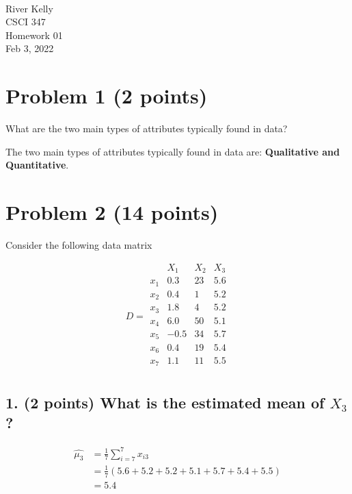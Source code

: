 \documentclass[11pt]{article}
\newcommand{\course}{CSCI 347}
\newcommand{\proj}{Homework 01}
\begin{document}
{ ~\\
    River Kelly \\
    \course \\
    \proj \\
    Feb 3, 2022 \\
}

\section*{Problem 1 (2 points)}

What are the two main types of attributes typically found in data?
\begin{tcolorbox}[width=\linewidth,title=Problem 1]
The two main types of attributes typically found in data are: \textbf{Qualitative and Quantitative}.
\end{tcolorbox}

\section*{Problem 2 (14 points)}

Consider the following data matrix

$$
    D = \begin{matrix}
            & X_1   & X_2   & X_3 \\
        x_1 &  0.3  & 23    & 5.6 \\
        x_2 &  0.4  &  1    & 5.2 \\
        x_3 &  1.8  &  4    & 5.2 \\
        x_4 &  6.0  & 50    & 5.1 \\
        x_5 & -0.5  & 34    & 5.7 \\
        x_6 &  0.4  & 19    & 5.4 \\
        x_7 &  1.1  & 11    & 5.5 \\
    \end{matrix}
$$

\subsection*{\textbf{1. (2 points)} What is the estimated mean of $X_3$?}

\begin{align*}
    \hat{\mu_3} &= \frac{1}{7} \sum_{i=7}^{7} x_{i3}\\
    &= \frac{1}{7}(5.6 + 5.2 + 5.2 + 5.1 + 5.7 + 5.4 + 5.5)\\
    &= 5.4
\end{align*}
\end{document}
